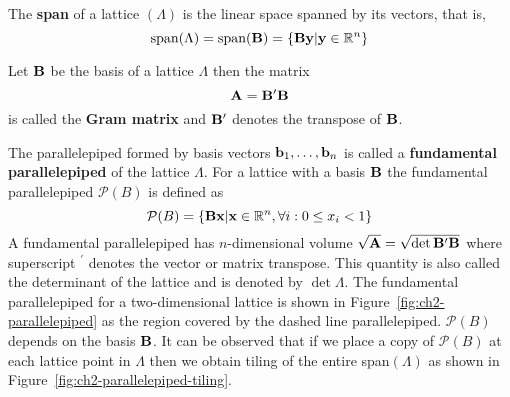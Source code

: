 The \textbf{span} of a lattice $(\Lambda)$ is the linear space spanned by its vectors, that is,
\[
\text{span}(\Lambda) = \text{span}(\mathbf{B}) = \{ \mathbf{B} \mathbf{y} | \mathbf{y} \in {\mathbb R}^n\}
\]

Let $\mathbf{B}$ be the basis of a lattice $\Lambda$ then the matrix
\[
\mathbf{A} = \mathbf{B}^\prime \mathbf{B}
\]
is called the \textbf{Gram matrix} and $\mathbf{B}^\prime$ denotes the transpose of $\mathbf{B}$.


The parallelepiped formed by basis vectors $\mathbf{b}_1,\dots,\mathbf{b}_n$ is called a \textbf{fundamental parallelepiped} of the lattice $\Lambda$. For a lattice with a basis $\mathbf{B}$ the fundamental parallelepiped $\mathcal{P}(B)$ is defined as
\[
\mathcal{P}(B) = \{\mathbf{B} \mathbf{x} | \mathbf{x}\in {\mathbb R}^n, \forall i : 0 \leq x_i < 1 \}
\]
A fundamental parallelepiped has $n$-dimensional volume $\sqrt{\mathbf{A}} = \sqrt{\det \mathbf{B}^\prime\mathbf{B} }$ where superscript $^\prime$ denotes the vector or matrix transpose.  This quantity is also called the determinant of the lattice and is denoted by $\det\Lambda$.  The fundamental parallelepiped for a two-dimensional lattice is shown in Figure~\ref{fig:ch2-parallelepiped} as the region covered by the dashed line parallelepiped. $\mathcal{P}(B)$ depends on the basis $\mathbf{B}$. It can be observed that if we place a copy of $\mathcal{P}(B)$ at each lattice point in $\Lambda$ then we obtain tiling of the entire span$(\Lambda)$ as shown in Figure~\ref{fig:ch2-parallelepiped-tiling}.

